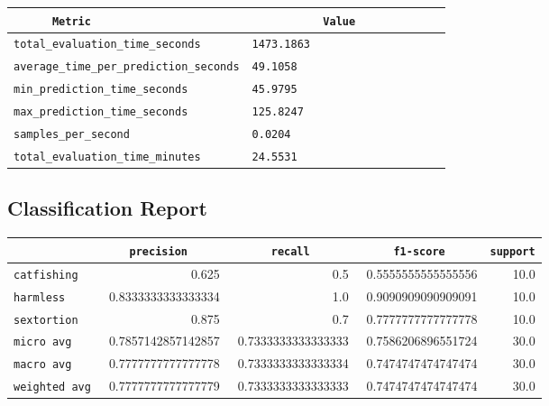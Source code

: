 \documentclass{article}
\begin{document}
\begin{center}
\begin{tabular}{l | l} \hline
    \verb|      Metric     | & \verb|           Value           | \\ \hline
    \hline
    \verb|total_evaluation_time_seconds| & \verb|1473.1863                    | \\ \hline
    \verb|average_time_per_prediction_seconds| & \verb|49.1058                      | \\ \hline
    \verb|min_prediction_time_seconds| & \verb|45.9795                      | \\ \hline
    \verb|max_prediction_time_seconds| & \verb|125.8247                     | \\ \hline
    \verb|samples_per_second| & \verb|0.0204                       | \\ \hline
    \verb|total_evaluation_time_minutes| & \verb|24.5531                      | \\ \hline
\end{tabular}
\end{center}

\subsection{Classification Report}

\begin{center}
\begin{tabular}{l | r | r | r | r} \hline
    \verb|            | & \verb|    precision     | & \verb|      recall      | & \verb|     f1-score     | & \verb|support| \\ \hline
    \hline
    \verb|catfishing | & 0.625 & 0.5 & 0.5555555555555556 &    10.0 \\ \hline
    \verb|harmless   | & 0.8333333333333334 & 1.0 & 0.9090909090909091 &    10.0 \\ \hline
    \verb|sextortion | & 0.875 & 0.7 & 0.7777777777777778 &    10.0 \\ \hline
    \verb|micro avg  | & 0.7857142857142857 & 0.7333333333333333 & 0.7586206896551724 &    30.0 \\ \hline
    \verb|macro avg  | & 0.7777777777777778 & 0.7333333333333334 & 0.7474747474747474 &    30.0 \\ \hline
    \verb|weighted avg| & 0.7777777777777779 & 0.7333333333333333 & 0.7474747474747474 &    30.0 \\ \hline
\end{tabular}
\end{center}
\end{document}
